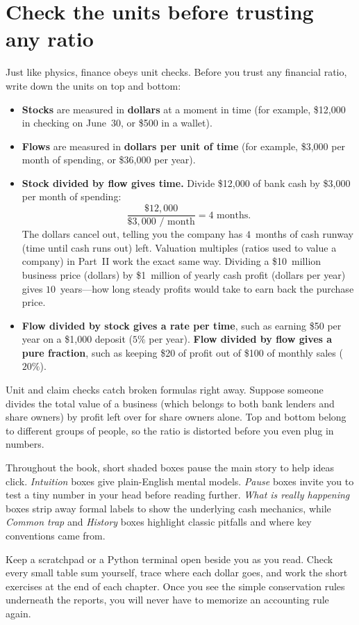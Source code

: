 \section*{Check the units before trusting any ratio}

Just like physics, finance obeys unit checks. Before you trust any financial ratio, write down the units on top and bottom:

\begin{itemize}
  \item \textbf{Stocks} are measured in \textbf{dollars} at a moment in time (for example, \$12,000 in checking on June~30, or \$500 in a wallet).
  \item \textbf{Flows} are measured in \textbf{dollars per unit of time} (for example, \$3,000 per month of spending, or \$36,000 per year).
  \item \textbf{Stock divided by flow gives time.} Divide \$12,000 of bank cash by \$3,000 per month of spending:
  \[
    \frac{\$12{,}000}{\$3{,}000\text{ / month}} = 4\text{ months}.
  \]
  The dollars cancel out, telling you the company has $4$~months of cash runway (time until cash runs out) left. Valuation multiples (ratios used to value a company) in Part~II work the exact same way. Dividing a \$10~million business price (dollars) by \$1~million of yearly cash profit (dollars per year) gives $10$~years---how long steady profits would take to earn back the purchase price.
  \item \textbf{Flow divided by stock gives a rate per time}, such as earning \$50 per year on a \$1,000 deposit ($5\%$ per year). \textbf{Flow divided by flow gives a pure fraction}, such as keeping \$20 of profit out of \$100 of monthly sales ($20\%$).
\end{itemize}

\begin{trapbox}
Unit and claim checks catch broken formulas right away. Suppose someone divides the total value of a business (which belongs to both bank lenders and share owners) by profit left over for share owners alone. Top and bottom belong to different groups of people, so the ratio is distorted before you even plug in numbers.
\end{trapbox}

\begin{happeningbox}
Throughout the book, short shaded boxes pause the main story to help ideas click. \emph{Intuition} boxes give plain-English mental models. \emph{Pause} boxes invite you to test a tiny number in your head before reading further. \emph{What is really happening} boxes strip away formal labels to show the underlying cash mechanics, while \emph{Common trap} and \emph{History} boxes highlight classic pitfalls and where key conventions came from.
\end{happeningbox}

\begin{intuitionbox}
Keep a scratchpad or a Python terminal open beside you as you read. Check every small table sum yourself, trace where each dollar goes, and work the short exercises at the end of each chapter. Once you see the simple conservation rules underneath the reports, you will never have to memorize an accounting rule again.
\end{intuitionbox}
